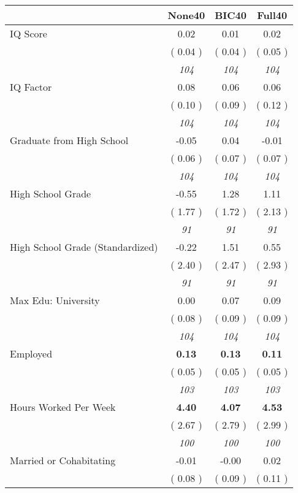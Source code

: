 \begin{tabular}{l c c c}
\toprule
 & None40 & BIC40 & Full40 \\
\midrule
IQ Score &      0.02 &      0.01 &      0.02 \\
& (     0.04 ) & (     0.04 ) & (     0.05 ) \\
& \textit{ 104 } & \textit{ 104 } & \textit{ 104 } \\
IQ Factor &      0.08 &      0.06 &      0.06 \\
& (     0.10 ) & (     0.09 ) & (     0.12 ) \\
& \textit{ 104 } & \textit{ 104 } & \textit{ 104 } \\
Graduate from High School &     -0.05 &      0.04 &     -0.01 \\
& (     0.06 ) & (     0.07 ) & (     0.07 ) \\
& \textit{ 104 } & \textit{ 104 } & \textit{ 104 } \\
High School Grade &     -0.55 &      1.28 &      1.11 \\
& (     1.77 ) & (     1.72 ) & (     2.13 ) \\
& \textit{ 91 } & \textit{ 91 } & \textit{ 91 } \\
High School Grade (Standardized) &     -0.22 &      1.51 &      0.55 \\
& (     2.40 ) & (     2.47 ) & (     2.93 ) \\
& \textit{ 91 } & \textit{ 91 } & \textit{ 91 } \\
Max Edu: University &      0.00 &      0.07 &      0.09 \\
& (     0.08 ) & (     0.09 ) & (     0.09 ) \\
& \textit{ 104 } & \textit{ 104 } & \textit{ 104 } \\
Employed & \textbf{      0.13 } & \textbf{      0.13 } & \textbf{      0.11 } \\
& (     0.05 ) & (     0.05 ) & (     0.05 ) \\
& \textit{ 103 } & \textit{ 103 } & \textit{ 103 } \\
Hours Worked Per Week & \textbf{      4.40 } & \textbf{      4.07 } & \textbf{      4.53 } \\
& (     2.67 ) & (     2.79 ) & (     2.99 ) \\
& \textit{ 100 } & \textit{ 100 } & \textit{ 100 } \\
Married or Cohabitating &     -0.01 &     -0.00 &      0.02 \\
& (     0.08 ) & (     0.09 ) & (     0.11 ) \\

\end{tabular}
